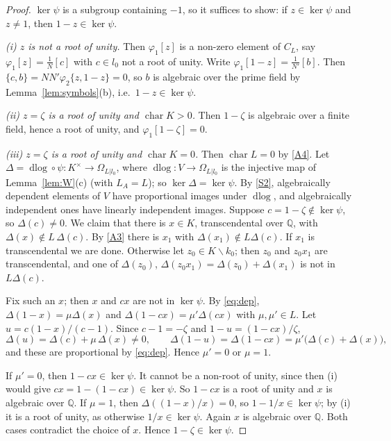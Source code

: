 \documentclass[11pt]{amsart}
\theoremstyle{definition}
\theoremstyle{remark}
\newcommand{\QQ}{\mathbb{Q}}
\newcommand{\chr}{\operatorname{char}}
\newcommand{\dlog}{\operatorname{dlog}}
\newcommand{\sm}{\smallsetminus}
\begin{document}
\begin{proof}
$\ker\psi$ is a subgroup containing $-1$, so it suffices to show: if $z\in\ker\psi$ and $z\ne1$, then $1-z\in\ker\psi$.

\emph{(i) $z$ is not a root of unity.} Then $\varphi_1[z]$ is a non-zero element of $C_L$, say $\varphi_1[z]=\frac1N[c]$ with $c\in l_0$ not a root of unity. Write $\varphi_1[1-z]=\frac1{N'}[b]$. Then $\{c,b\}=NN'\varphi_2\{z,1-z\}=0$,
so $b$ is algebraic over the prime field by Lemma~\ref{lem:symbols}(b), i.e.\ $1-z\in\ker\psi$.

\emph{(ii) $z=\zeta$ is a root of unity and $\chr K>0$.} Then $1-\zeta$ is algebraic over a finite field, hence a root of unity, and $\varphi_1[1-\zeta]=0$.

\emph{(iii) $z=\zeta$ is a root of unity and $\chr K=0$.} Then $\chr L=0$ by \ref{A4}. Let $\Delta=\dlog\circ\psi\colon K^\times\to\Omega_{L|l_0}$, where $\dlog\colon V\to\Omega_{L|l_0}$ is the injective map of Lemma~\ref{lem:W}(c) (with $L_A=L$); so $\ker\Delta=\ker\psi$. By \ref{S2}, algebraically dependent elements of $V$ have proportional images under $\dlog$, and algebraically independent ones have linearly independent images. Suppose $c=1-\zeta\notin\ker\psi$, so $\Delta(c)\ne0$.
We claim that there is $x\in K$, transcendental over $\QQ$, with $\Delta(x)\notin L\,\Delta(c)$. By \ref{A3} there is $x_1$ with $\Delta(x_1)\notin L\Delta(c)$. If $x_1$ is transcendental we are done.
Otherwise let $z_0\in K\sm k_0$; then $z_0$ and $z_0x_1$ are transcendental, and one of $\Delta(z_0)$, $\Delta(z_0x_1)=\Delta(z_0)+\Delta(x_1)$ is not in $L\Delta(c)$.

Fix such an $x$; then $x$ and $cx$ are not in $\ker\psi$. By \eqref{eq:dep}, $\Delta(1-x)=\mu\Delta(x)$ and $\Delta(1-cx)=\mu'\Delta(cx)$ with $\mu,\mu'\in L$. Let $u=c(1-x)/(c-1)$. Since $c-1=-\zeta$ and $1-u=(1-cx)/\zeta$,
\[ \Delta(u)=\Delta(c)+\mu\,\Delta(x)\neq0,\qquad \Delta(1-u)=\Delta(1-cx)=\mu'\bigl(\Delta(c)+\Delta(x)\bigr), \]
and these are proportional by \eqref{eq:dep}. Hence $\mu'=0$ or $\mu=1$.

If $\mu'=0$, then $1-cx\in\ker\psi$. It cannot be a non-root of unity, since then (i) would give $cx=1-(1-cx)\in\ker\psi$. So $1-cx$ is a root of unity and $x$ is algebraic over $\QQ$.
If $\mu=1$, then $\Delta((1-x)/x)=0$, so $1-1/x\in\ker\psi$; by (i) it is a root of unity, as otherwise $1/x\in\ker\psi$. Again $x$ is algebraic over $\QQ$.
Both cases contradict the choice of $x$. Hence $1-\zeta\in\ker\psi$.
\end{proof}
\end{document}
